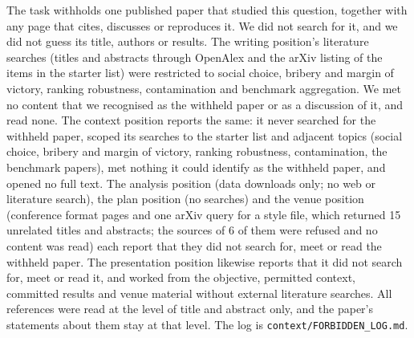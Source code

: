 The task withholds one published paper that studied this question, together with any page that cites, discusses or reproduces it. We did not search for it, and we did not guess its title, authors or results. The writing position's literature searches (titles and abstracts through OpenAlex and the arXiv listing of the items in the starter list) were restricted to social choice, bribery and margin of victory, ranking robustness, contamination and benchmark aggregation. We met no content that we recognised as the withheld paper or as a discussion of it, and read none. The context position reports the same: it never searched for the withheld paper, scoped its searches to the starter list and adjacent topics (social choice, bribery and margin of victory, ranking robustness, contamination, the benchmark papers), met nothing it could identify as the withheld paper, and opened no full text. The analysis position (data downloads only; no web or literature search), the plan position (no searches) and the venue position (conference format pages and one arXiv query for a style file, which returned 15 unrelated titles and abstracts; the sources of 6 of them were refused and no content was read) each report that they did not search for, meet or read the withheld paper. The presentation position likewise reports that it did not search for, meet or read it, and worked from the objective, permitted context, committed results and venue material without external literature searches. All references were read at the level of title and abstract only, and the paper's statements about them stay at that level. The log is \texttt{context/FORBIDDEN\_LOG.md}.
